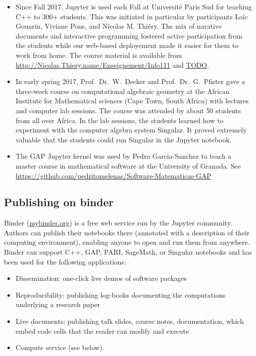 \documentclass{deliverablereport}
\begin{document}
\begin{itemize}
\item Since Fall 2017, Jupyter is used each Fall at Université Paris Sud for teaching C++ to 300+ students.
This was initiated in particular by \ODK participants Loïc Gouarin, Viviane Pons, and Nicolas M. Thiéry.
The mix of narative documents and interactive programming fostered active participation from the students
while our web-based deployement made it easier for them to work from home.
The course material is available from \url{http://Nicolas.Thiery.name/Enseignement/Info111} and \url{TODO}.

\item In early spring 2017, Prof.~Dr.~W.~Decker and Prof.~Dr.~G.~Pfister gave a
three-week course on computational algebraic geometry at the
African Institute for Mathematical sciences (Cape Town, South Africa)
with lectures and computer lab sessions.
The course was attended by about 50 students from all over Africa.
In the lab sessions, the students learned how to experiment with the computer algebra system Singular.
It proved extremely valuable that the students could run Singular in the Jupyter notebook.

\item The GAP Jupyter kernel was used by Pedro Garcia-Sanchez to teach a master course in mathematical software at the University of Granada.
See \url{https://github.com/pedritomelenas/Software-Matematicas-GAP}
\end{itemize}

\subsection{Publishing on binder}

Binder (\url{mybinder.org}) is a free web service run by the Jupyter community.
Authors can publish their notebooks there (annotated with a description of their computing environment),
enabling anyone to open and run them from anywhere.
Binder can support C++, GAP, PARI, SageMath, or Singular notebooks and has been used for the following applications:

\begin{itemize}
\item Dissemination: one-click live demos of software packages
\item Reproducibility: publishing log-books documenting the computations underlying a research paper
\item Live documents: publishing talk slides, course notes, documentation, which embed code cells that the reader can modify and execute
\item Compute service (see below).
\end{itemize}
\end{document}

